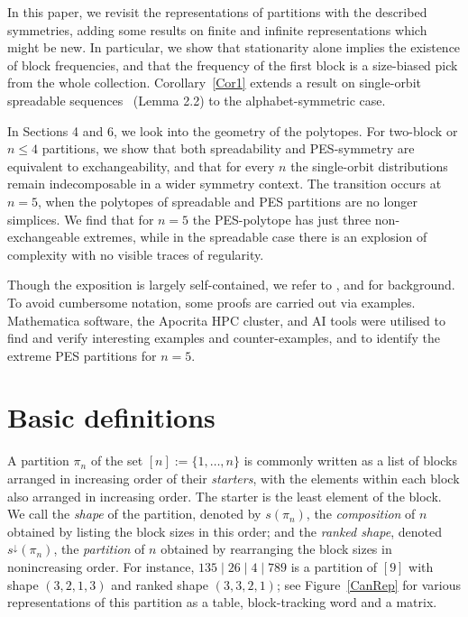 \documentclass{article}
\begin{document}
In this paper, we revisit the representations of partitions with the described symmetries, adding some results on finite and infinite representations which might be new. In particular, we show that stationarity alone implies the existence of block frequencies, and that the frequency of the first block is a size-biased pick from the whole collection. Corollary~\ref{Cor1} extends a result on single-orbit spreadable sequences~\cite{KallenbergPTRF} (Lemma 2.2) to the alphabet-symmetric case.

In Sections 4 and 6, we look into the geometry of the polytopes. For two-block or $n \leq 4$ partitions, we show that both spreadability and PES-symmetry are equivalent to exchangeability, and that for every $n$ the single-orbit distributions remain indecomposable in a wider symmetry context. The transition occurs at $n=5$, when the polytopes of spreadable and PES partitions are no longer simplices. We find that for $n=5$ the PES-polytope has just three non-exchangeable extremes, while in the spreadable case there is an explosion of complexity with no visible traces of regularity.

Though the exposition is largely self-contained, we refer to \cite{BO}, \cite{Kallenberg} and \cite{CSP} for background. To avoid cumbersome notation, some proofs are carried out via examples. Mathematica software, the Apocrita HPC cluster, and AI tools were utilised to find and verify interesting examples and counter-examples, and to identify the extreme PES partitions for $n=5$.


























\section{Basic definitions}
\noindent
A partition $\pi_n$ of the set $[n]:=\{1,\ldots,n\}$ is commonly written as a list of blocks arranged in increasing order of their \emph{starters}, with the elements within each block also arranged in increasing order.
The starter is the least element of the block.
We call the \emph{shape} of the partition, denoted by $s(\pi_n)$, the {\it composition} of $n$ obtained by listing the block sizes in this order;
and the \emph{ranked shape}, denoted $s^\downarrow(\pi_n)$, the {\it partition} of $n$ obtained by  rearranging the block sizes in nonincreasing order.
For instance,
$135 \mid 26 \mid 4 \mid 789$
is a partition of $[9]$ with shape
$(3,2,1,3)$ and ranked shape $(3,3,2,1)$; see Figure~\ref{CanRep} for various representations of this partition
as a table, block-tracking word and a matrix.
\end{document}
